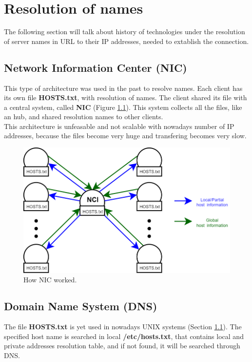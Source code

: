 \chapter{Resolution of names}
The following section will talk about history of technologies under the resolution of server names in URL to their IP addresses, needed to extablish the connection.

\section{Network Information Center (NIC)}\label{NIC_section}
This type of architecture was used in the past to resolve names. Each client has its own file \textbf{HOSTS.txt}, with resolution of names. The client shared its file with a central system, called \textbf{NIC} (Figure \ref{NIC}). This system collects all the files, like an hub, and shared resolution names to other clients.\\
This architecture is unfeasable and not scalable with nowadays number of IP addresses, because the files become very huge and transfering becomes very slow.\\
\begin{figure}[h]
\centering
\includegraphics[scale=0.4]{Images/Resolution/NIC}
\caption{\footnotesize{How NIC worked.}}\label{NIC}
\end{figure}


\section{Domain Name System (DNS)}\label{DNS_system}
The file \textbf{HOSTS.txt} is yet used in nowadays UNIX systems (Section \ref{NIC_section}). The specified host name is searched in local \textbf{/etc/hosts.txt}, that contains local and private addresses resolution table, and if not found, it will be searched through DNS\cite{RFC1034}.

